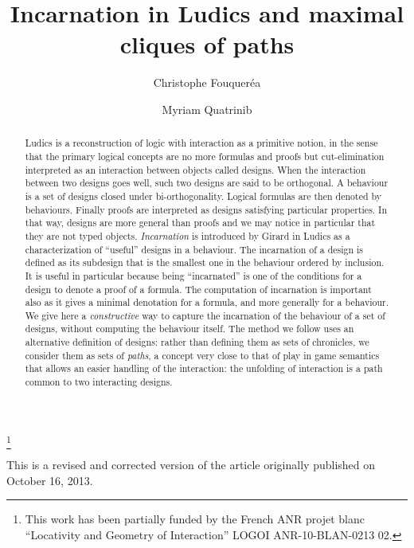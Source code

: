 \documentclass{LMCS}
\begin{document}
\title[Incarnation in Ludics]{Incarnation in Ludics and maximal cliques of paths\rsuper*}

\author[C.~Fouquer\'e]{Christophe Fouquer\'e\rsuper a}	\address{{\lsuper a}Universit\'e Paris 13, Sorbonne Paris Cit\'e, LIPN, CNRS, (UMR 7030), F--93430, Villetaneuse, France}	  

\author[M.~Quatrini]{Myriam Quatrini\rsuper b}	\address{{\lsuper b}IML--FRE 3529 Aix-Marseille Universit\'e, CNRS, Campus de Luminy, case 907, F--13288 Marseille cedex 9, France}	




\thanks{This work has been partially funded by the French ANR projet blanc ``Locativity and Geometry of Interaction'' LOGOI ANR-10-BLAN-0213 02.}

\begin{revision}
  This is a revised and corrected version of the article originally
  published on October 16, 2013.
\end{revision}

\begin{abstract}
Ludics is a reconstruction of logic with interaction as a primitive notion, in the sense
that the primary logical concepts are no more formulas and proofs but cut-elimination
interpreted as an interaction between objects called designs.
When the interaction between two designs goes well, such two designs are said to be orthogonal.
A behaviour is a set of designs closed under bi-orthogonality.
Logical formulas are then denoted by behaviours. Finally proofs are interpreted as designs satisfying particular properties.
In that way, designs are more general than proofs and we may notice in particular that they are not typed objects.
{\em Incarnation} is introduced by Girard in Ludics as a characterization of ``useful'' designs in a behaviour. 
The incarnation of a design is defined as its subdesign that is the smallest one in the behaviour ordered by inclusion. 
It is useful in particular because being ``incarnated'' is one of the conditions for a design to denote a proof of a formula.
The computation of incarnation is important also as it gives a minimal denotation for a formula, and more generally for a behaviour. 
We give here a {\em constructive} way to capture the incarnation of the behaviour of a set of designs, without computing the behaviour itself. 
The method we follow uses an alternative definition of designs: rather than defining them as sets of chronicles, we consider them as sets of {\em paths}, a concept very close to that of play in game semantics that allows an easier handling of the interaction: the unfolding of interaction is a path common to two interacting designs. 

\end{abstract}
\end{document}
